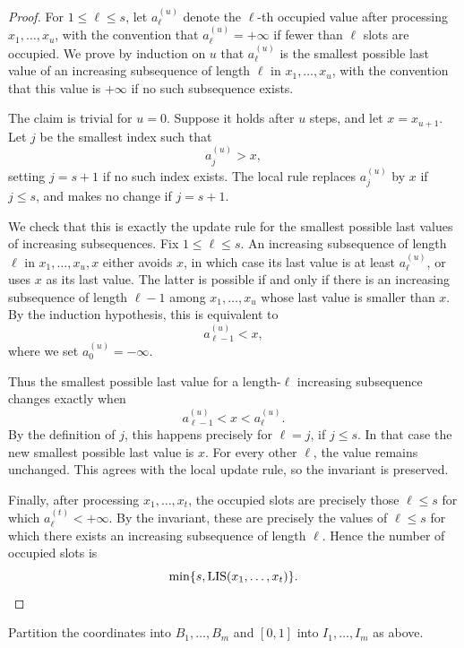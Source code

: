 \documentclass[11pt,reqno,letterpaper]{amsart}
\theoremstyle{definition}
\numberwithin{equation}{section}
\DeclareMathOperator{\LIS}{LIS}
\begin{document}
\begin{proof}
For \(1\le \ell\le s\), let \(a_\ell^{(u)}\) denote the \(\ell\)-th occupied value after processing \(x_1,\dots,x_u\), with the convention that \(a_\ell^{(u)}=+\infty\) if fewer than \(\ell\) slots are occupied. We prove by induction on \(u\) that \(a_\ell^{(u)}\) is the smallest possible last value of an increasing subsequence of length \(\ell\) in \(x_1,\dots,x_u\), with the convention that this value is \(+\infty\) if no such subsequence exists.

The claim is trivial for \(u=0\). Suppose it holds after \(u\) steps, and let \(x=x_{u+1}\). Let \(j\) be the smallest index such that
\[
a_j^{(u)}>x,
\]
setting \(j=s+1\) if no such index exists. The local rule replaces \(a_j^{(u)}\) by \(x\) if \(j\le s\), and makes no change if \(j=s+1\).

We check that this is exactly the update rule for the smallest possible last values of increasing subsequences. Fix \(1\le \ell\le s\). An increasing subsequence of length \(\ell\) in \(x_1,\dots,x_u,x\) either avoids \(x\), in which case its last value is at least \(a_\ell^{(u)}\), or uses \(x\) as its last value. The latter is possible if and only if there is an increasing subsequence of length \(\ell-1\) among \(x_1,\dots,x_u\) whose last value is smaller than \(x\). By the induction hypothesis, this is equivalent to
\[
a_{\ell-1}^{(u)}<x,
\]
where we set \(a_0^{(u)}=-\infty\).

Thus the smallest possible last value for a length-\(\ell\) increasing subsequence changes exactly when
\[
a_{\ell-1}^{(u)}<x<a_\ell^{(u)}.
\]
By the definition of \(j\), this happens precisely for \(\ell=j\), if \(j\le s\). In that case the new smallest possible last value is \(x\). For every other \(\ell\), the value remains unchanged. This agrees with the local update rule, so the invariant is preserved.

Finally, after processing \(x_1,\dots,x_t\), the occupied slots are precisely those \(\ell\le s\) for which \(a_\ell^{(t)}<+\infty\). By the invariant, these are precisely the values of \(\ell\le s\) for which there exists an increasing subsequence of length \(\ell\). Hence the number of occupied slots is
\[
\min\{s,\LIS(x_1,\dots,x_t)\}. \qedhere
\]
\end{proof}

\begin{algorithm}[t]
\caption{The with-replacement strategy \(S'_r\)}
\label{alg:with-replacement-block}
\DontPrintSemicolon
Partition the coordinates into \(B_1,\dots,B_m\) and \([0,1]\) into \(I_1,\dots,I_m\) as above.\;
\end{algorithm}
\end{document}
